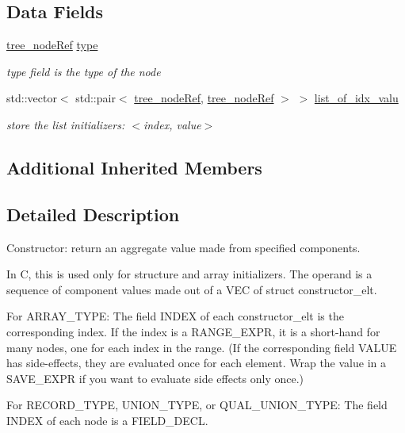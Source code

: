 \subsection*{Data Fields}
\begin{DoxyCompactItemize}
\item 
\hyperlink{tree__node_8hpp_a6ee377554d1c4871ad66a337eaa67fd5}{tree\+\_\+node\+Ref} \hyperlink{structconstructor_aa8d1c099eb1ac75e7a2bff4e081efb41}{type}
\begin{DoxyCompactList}\small\item\em type field is the type of the node \end{DoxyCompactList}\item 
std\+::vector$<$ std\+::pair$<$ \hyperlink{tree__node_8hpp_a6ee377554d1c4871ad66a337eaa67fd5}{tree\+\_\+node\+Ref}, \hyperlink{tree__node_8hpp_a6ee377554d1c4871ad66a337eaa67fd5}{tree\+\_\+node\+Ref} $>$ $>$ \hyperlink{structconstructor_a0da8ab8a69e59238810e8aa8d2e8caff}{list\+\_\+of\+\_\+idx\+\_\+valu}
\begin{DoxyCompactList}\small\item\em store the list initializers\+: $<$index, value$>$ \end{DoxyCompactList}\end{DoxyCompactItemize}
\subsection*{Additional Inherited Members}


\subsection{Detailed Description}
Constructor\+: return an aggregate value made from specified components. 

In C, this is used only for structure and array initializers. The operand is a sequence of component values made out of a V\+EC of struct constructor\+\_\+elt.

For A\+R\+R\+A\+Y\+\_\+\+T\+Y\+PE\+: The field I\+N\+D\+EX of each constructor\+\_\+elt is the corresponding index. If the index is a R\+A\+N\+G\+E\+\_\+\+E\+X\+PR, it is a short-\/hand for many nodes, one for each index in the range. (If the corresponding field V\+A\+L\+UE has side-\/effects, they are evaluated once for each element. Wrap the value in a S\+A\+V\+E\+\_\+\+E\+X\+PR if you want to evaluate side effects only once.)

For R\+E\+C\+O\+R\+D\+\_\+\+T\+Y\+PE, U\+N\+I\+O\+N\+\_\+\+T\+Y\+PE, or Q\+U\+A\+L\+\_\+\+U\+N\+I\+O\+N\+\_\+\+T\+Y\+PE\+: The field I\+N\+D\+EX of each node is a F\+I\+E\+L\+D\+\_\+\+D\+E\+CL. 

